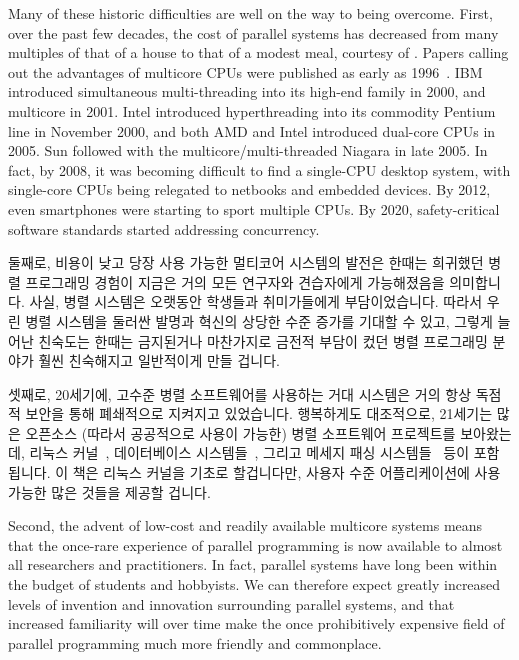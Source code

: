 Many of these historic difficulties are well on the way to being overcome.
First, over the past few decades, the cost of parallel systems
has decreased from many multiples of that of a house to that of a
modest meal, courtesy of .
Papers calling out the advantages of multicore CPUs were published
as early as 1996~\cite{Olukotun96}.
IBM introduced simultaneous multi-threading
into its high-end \Power{} family in 2000, and multicore in 2001.
Intel introduced hyperthreading into its commodity Pentium line in
November 2000, and both AMD and Intel introduced
dual-core CPUs in 2005.
Sun followed with the multicore/multi-threaded Niagara in late 2005.
In fact, by 2008, it was becoming difficult
to find a single-CPU desktop system, with single-core CPUs being
relegated to netbooks and embedded devices.
By 2012, even smartphones were starting to sport multiple CPUs.
By 2020, safety-critical software standards started addressing
concurrency.

\fi

둘째로, 비용이 낮고 당장 사용 가능한 멀티코어 시스템의 발전은 한때는 희귀했던
병렬 프로그래밍 경험이 지금은 거의 모든 연구자와 견습자에게 가능해졌음을
의미합니다.
사실, 병렬 시스템은 오랫동안 학생들과 취미가들에게 부담이었습니다.
따라서 우린 병렬 시스템을 둘러싼 발명과 혁신의 상당한 수준 증가를 기대할 수
있고, 그렇게 늘어난 친숙도는 한때는 금지된거나 마찬가지로 금전적 부담이 컸던
병렬 프로그래밍 분야가 훨씬 친숙해지고 일반적이게 만들 겁니다.

셋째로, 20세기에, 고수준 병렬 소프트웨어를 사용하는 거대 시스템은 거의 항상
독점적 보안을 통해 폐쇄적으로 지켜지고 있었습니다.
행복하게도 대조적으로, 21세기는 많은 오픈소스 (따라서 공공적으로 사용이 가능한)
병렬 소프트웨어 프로젝트를 보아왔는데, 리눅스 커널~\cite{Torvalds2.6kernel},
데이터베이스 시스템들~\cite{PostgreSQL2008,MySQL2008}, 그리고 메세지 패싱
시스템들~\cite{OpenMPI2008,BOINC2008} 등이 포함됩니다.
이 책은 리눅스 커널을 기초로 할겁니다만, 사용자 수준 어플리케이션에 사용 가능한
많은 것들을 제공할 겁니다.

\iffalse

Second, the advent of low-cost and readily available multicore systems
means that the once-rare experience of parallel programming is
now available to almost all researchers and practitioners.
In fact, parallel systems have long been within the budget of students
and hobbyists.
We can therefore expect greatly increased levels of invention and
innovation surrounding parallel systems, and that increased familiarity
will over time make the once prohibitively expensive field of parallel
programming much more friendly and commonplace.

